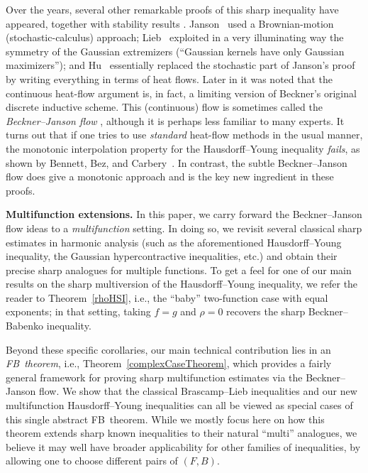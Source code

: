 \documentclass[9pt, a4paper]{amsart}
\newcommand{\1}{{\chi_{}}}%
\numberwithin{equation}{section}
\begin{document}
Over the years, several other remarkable proofs of this sharp inequality have appeared, together with stability results \cite{Christ}. Janson~\cite{Jans} used a Brownian-motion (stochastic-calculus) approach; Lieb~\cite{Lieb} exploited in a very illuminating way the symmetry of the Gaussian extremizers (``Gaussian kernels have only Gaussian maximizers''); and Hu~\cite{Hu01} essentially replaced the stochastic part of Janson's proof by writing everything in terms of heat flows. Later in \cite{IvanVol} it was noted that the continuous heat-flow argument is, in fact, a limiting version of Beckner's original discrete inductive scheme. This (continuous) flow is sometimes called the \emph{Beckner--Janson flow} \cite{IvanVol}, although it is perhaps less familiar to many experts. It turns out that if one tries to use \emph{standard} heat-flow methods in the usual manner, the monotonic interpolation property for the Hausdorff--Young inequality \emph{fails}, as shown by Bennett, Bez, and Carbery~\cite{BannettBeazCarbery}. In contrast, the subtle Beckner--Janson flow does give a monotonic approach and is the key new ingredient in these proofs.

\medskip

\noindent
\textbf{Multifunction extensions.}
In this paper, we carry forward the Beckner--Janson flow ideas to a \emph{multifunction} setting. In doing so, we revisit several classical sharp estimates in harmonic analysis (such as the aforementioned Hausdorff--Young inequality, the Gaussian hypercontractive inequalities, etc.) and obtain their precise sharp analogues for multiple functions. To get a feel for one of our main results on the sharp multiversion of the Hausdorff--Young inequality, we refer the reader to Theorem~\ref{rhoHSI}, i.e., the “baby” two-function case with equal exponents; in that setting, taking \(f = g\) and \(\rho = 0\)  recovers the sharp Beckner--Babenko inequality.

Beyond these specific corollaries, our main technical contribution lies in an  \emph{FB~theorem}, i.e., Theorem~\ref{complexCaseTheorem}, which provides a fairly general framework for proving sharp multifunction estimates via the Beckner--Janson flow. We show that the classical Brascamp--Lieb inequalities  and our new multifunction Hausdorff--Young inequalities can all be viewed as special cases of this single abstract FB~theorem. While we mostly focus here on how this theorem extends sharp known inequalities to their natural ``multi'' analogues, we believe it may well have broader applicability for other families of inequalities, by allowing one to choose different pairs of \((F,B)\). 
\end{document}
